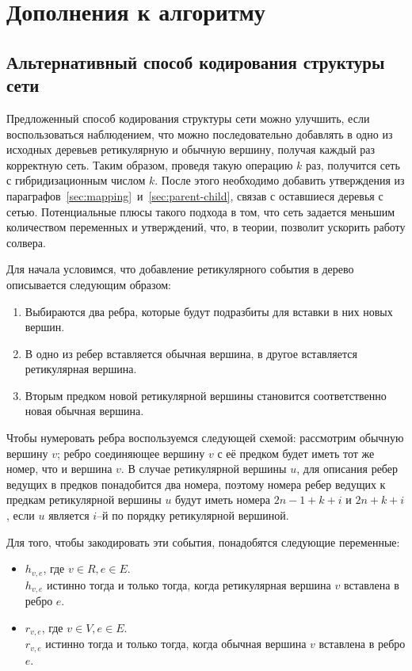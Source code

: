 \FloatBarrier
\chapter{Дополнения к алгоритму}

\FloatBarrier
\section{Альтернативный способ кодирования структуры сети}

Предложенный способ кодирования структуры сети можно улучшить, если воспользоваться наблюдением, что можно последовательно добавлять в одно из исходных деревьев ретикулярную и обычную вершину, получая каждый раз корректную сеть.
Таким образом, проведя такую операцию $k$ раз, получится сеть с гибридизационным числом $k$.
После этого необходимо добавить утверждения из параграфов~\ref{sec:mapping}~и~\ref{sec:parent-child}, связав с оставшиеся деревья с сетью.
Потенциальные плюсы такого подхода в том, что сеть задается меньшим количеством переменных и утверждений, что, в теории, позволит ускорить работу солвера.

Для начала условимся, что добавление ретикулярного события в дерево описывается следующим образом:

\begin{enumerate}
	\item Выбираются два ребра, которые будут подразбиты для вставки в них новых вершин.
	\item В одно из ребер вставляется обычная вершина, в другое вставляется ретикулярная вершина.
	\item Вторым предком новой ретикулярной вершины становится соответственно новая обычная вершина.
\end{enumerate}

Чтобы нумеровать ребра воспользуемся следующей схемой: рассмотрим обычную вершину $v$; ребро соединяющее вершину $v$ с её предком будет иметь тот же номер, что и вершина $v$.
В случае ретикулярной вершины $u$, для описания ребер ведущих в предков понадобится два номера, поэтому номера ребер ведущих к предкам ретикулярной вершины $u$ будут иметь номера $2n - 1 + k + i$ и $2n + k + i$, если $u$ является $i$--й по порядку ретикулярной вершиной.

Для того, чтобы закодировать эти события, понадобятся следующие переменные:

\begin{itemize}
	\item $h_{v,e}$, где $v \in R, e \in E$. \\
	$h_{v,e}$ истинно тогда и только тогда, когда ретикулярная вершина $v$ вставлена в ребро $e$.
	\item $r_{v,e}$, где $v \in V, e \in E$. \\
	$r_{v,e}$ истинно тогда и только тогда, когда обычная вершина $v$ вставлена в ребро $e$.
\end{itemize}

